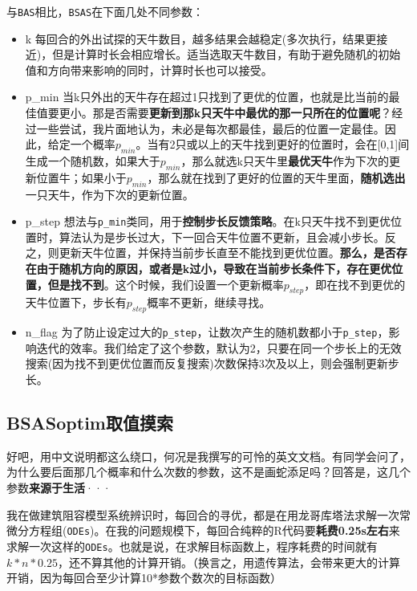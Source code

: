 \documentclass[]{ctexbook}
\providecommand{\tightlist}{%
  \setlength{\itemsep}{0pt}\setlength{\parskip}{0pt}}
\begin{document}
与\texttt{BAS}相比，\texttt{BSAS}在下面几处不同参数：

\begin{itemize}
\tightlist
\item
  k
  每回合的外出试探的天牛数目，越多结果会越稳定(多次执行，结果更接近)，但是计算时长会相应增长。适当选取天牛数目，有助于避免随机的初始值和方向带来影响的同时，计算时长也可以接受。
\item
  p\_min
  当k只外出的天牛存在超过1只找到了更优的位置，也就是比当前的最佳值要更小。那是否需要\textbf{更新到那k只天牛中最优的那一只所在的位置呢}？经过一些尝试，我片面地认为，未必是每次都最佳，最后的位置一定最佳。因此，给定一个概率\(p_{min}\)。当有2只或以上的天牛找到更好的位置时，会在{[}0,1{]}间生成一个随机数，如果大于\(p_{min}\)，那么就选k只天牛里\textbf{最优天牛}作为下次的更新位置牛；如果小于\(p_{min}\)，那么就在找到了更好的位置的天牛里面，\textbf{随机选出}一只天牛，作为下次的更新位置。
\item
  p\_step
  想法与\texttt{p\_min}类同，用于\textbf{控制步长反馈策略}。在k只天牛找不到更优位置时，算法认为是步长过大，下一回合天牛位置不更新，且会减小步长。反之，则更新天牛位置，并保持当前步长直至不能找到更优位置。\textbf{那么，是否存在由于随机方向的原因，或者是k过小，导致在当前步长条件下，存在更优位置，但是找不到}。这个时候，我们设置一个更新概率\(p_{step}\)，即在找不到更优的天牛位置下，步长有\(p_{step}\)概率不更新，继续寻找。
\item
  n\_flag
  为了防止设定过大的\texttt{p\_step}，让数次产生的随机数都小于\texttt{p\_step}，影响迭代的效率。我们给定了这个参数，默认为2，只要在同一个步长上的无效搜索(因为找不到更优位置而反复搜索)次数保持3次及以上，则会强制更新步长。
\end{itemize}

\subsection{BSASoptim取值摸索}\label{BSAStrick}

好吧，用中文说明都这么绕口，何况是我撰写的可怜的英文文档。有同学会问了，为什么要后面那几个概率和什么次数的参数，这不是画蛇添足吗？回答是，这几个参数\textbf{来源于生活}···

我在做建筑阻容模型系统辨识时，每回合的寻优，都是在用龙哥库塔法求解一次常微分方程组(\texttt{ODEs})。在我的问题规模下，每回合纯粹的R代码要\textbf{耗费0.25s左右}来求解一次这样的\texttt{ODEs}。也就是说，在求解目标函数上，程序耗费的时间就有\(k*n*0.25\)，还不算其他的计算开销。（换言之，用遗传算法，会带来更大的计算开销，因为每回合至少计算10*参数个数次的目标函数）
\end{document}
